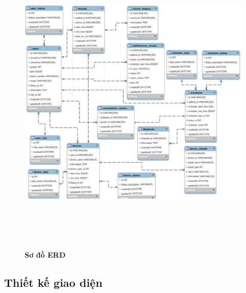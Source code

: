 \begin{figure}[H]
	\centering
	\includegraphics[width=15cm,height=15cm]{Images/system/fmECG_database.png}
	\caption[Sơ đồ ERD]{\bfseries \fontsize{12pt}{0pt}\selectfont Sơ đồ ERD}
	\label{fmECG_architecture-Database}
\end{figure}

\subsection{Thiết kế giao diện}


